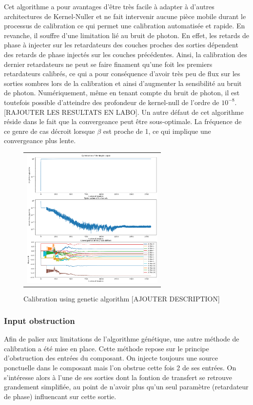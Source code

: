 \documentclass{aa}
\begin{document}
            Cet algorithme a pour avantages d'être très facile à adapter à d'autres architectures de Kernel-Nuller et ne fait intervenir aucune pièce mobile durant le processus de calibration ce qui permet une calibration automatisée et rapide. En revanche, il souffre d'une limitation lié au bruit de photon. En effet, les retards de phase à injecter sur les retardateurs des couches proches des sorties dépendent des retards de phase injectés sur les couches précédentes. Ainsi, la calibration des dernier retardateurs ne peut se faire finament qu'une foit les premiers retardateurs calibrés, ce qui a pour conséquence d'avoir très peu de flux sur les sorties sombres lors de la calibration et ainsi d'augmenter la sensibilité au bruit de photon. Numériquement, même en tenant compte du bruit de photon, il est toutefois possible d'atteindre des profondeur de kernel-null de l'ordre de $10^{-8}$. [RAJOUTER LES RESULTATS EN LABO]. Un autre défaut de cet algorithme réside dans le fait que la convergeance peut être sous-optimale. La fréquence de ce genre de cas décroit lorsque $\beta$ est proche de 1, ce qui implique une convergeance plus lente.

            \begin{figure}[H]
                \begin{center}
                \begin{tabular}{c}
                \includegraphics[height=7cm]{img/calibration_genetic.png}
                \end{tabular}
                \end{center}
                \caption[calibration_genetic] 
                { \label{fig:calibration_genetic} 
                Calibration using genetic algorithm [AJOUTER DESCRIPTION]}
            \end{figure}

        \subsubsection{Input obstruction}
            Afin de palier aux limitations de l'algorithme génétique, une autre méthode de calibration a été mise en place. Cette méthode repose sur le principe d'obstruction des entrées du composant. On injecte toujours une source ponctuelle dans le composant mais l'on obstrue cette fois 2 de ses entrées. On s'intéresse alors à l'une de ses sorties dont la fontion de transfert se retrouve grandement simplifiée, au point de n'avoir plus qu'un seul paramètre (retardateur de phase) influencant sur cette sortie.
\end{document}

